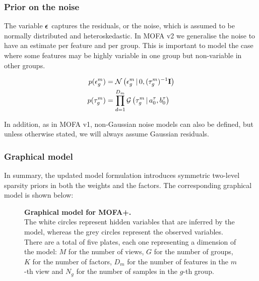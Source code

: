 \subsubsection{Prior on the noise}

The variable $\mbox{\boldmath $\epsilon$}$ captures the residuals, or the noise, which is assumed to be normally distributed and heteroskedastic. In MOFA v2 we generalise the noise to have an estimate per feature and per group. This is important to model the case where some features may be highly variable in one group but non-variable in other groups.

\begin{align}
	p(\epsilon^{m}_{g}) &= \mathcal{N}\left(\epsilon^{m}_{g} \,|\, 0,(\tau^{m}_{g})^{-1}{\bf I}\right) \\
	p(\tau^{m}_{g}) &= \prod_{d=1}^{D_m} \mathcal{G}\left(\tau^{m}_{g} \,|\, a_0^\tau, b_0^\tau\right)
\end{align}

In addition, as in MOFA v1, non-Gaussian noise models can also be defined, but unless otherwise stated, we will always assume Gaussian residuals.


\subsubsection{Graphical model}

In summary, the updated model formulation introduces symmetric two-level sparsity priors in both the weights and the factors. The corresponding graphical model is shown below:
\begin{figure}[H]
	\centering	
	
	\caption{\textbf{Graphical model for MOFA+.}\\
	The white circles represent hidden variables that are inferred by the model, whereas the grey circles represent the observed variables. There are a total of five plates, each one representing a dimension of the model: $M$ for the number of views, $G$ for the number of groups, $K$ for the number of factors, $D_m$ for the number of features in the $m$-th view and $N_g$ for the number of samples in the $g$-th group.
	}
	\label{fig:MOFA2}
\end{figure}

